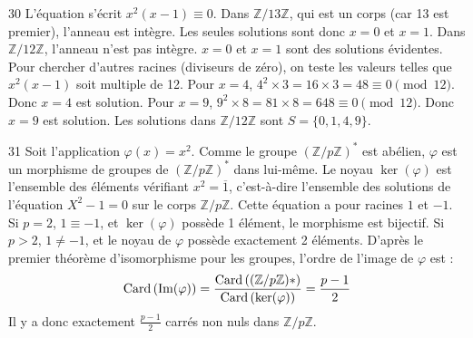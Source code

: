 \begin{correction}{30}
L'équation s'écrit $x^2(x-1) \equiv 0$.
Dans $\mathbb{Z}/13\mathbb{Z}$, qui est un corps (car 13 est premier), l'anneau est intègre. Les seules solutions sont donc $x=0$ et $x=1$.
Dans $\mathbb{Z}/12\mathbb{Z}$, l'anneau n'est pas intègre. $x=0$ et $x=1$ sont des solutions évidentes.
Pour chercher d'autres racines (diviseurs de zéro), on teste les valeurs telles que $x^2(x-1)$ soit multiple de 12.
Pour $x=4$, $4^2 \times 3 = 16 \times 3 = 48 \equiv 0 \pmod{12}$. Donc $x=4$ est solution.
Pour $x=9$, $9^2 \times 8 = 81 \times 8 = 648 \equiv 0 \pmod{12}$. Donc $x=9$ est solution.
Les solutions dans $\mathbb{Z}/12\mathbb{Z}$ sont $S = \{0, 1, 4, 9\}$.
\end{correction}

\begin{correction}{31}
Soit l'application $\varphi(x) = x^2$. Comme le groupe $(\mathbb{Z}/p\mathbb{Z})^*$ est abélien, $\varphi$ est un morphisme de groupes de $(\mathbb{Z}/p\mathbb{Z})^*$ dans lui-même. 
Le noyau $\ker(\varphi)$ est l'ensemble des éléments vérifiant $x^2 = \overline{1}$, c'est-à-dire l'ensemble des solutions de l'équation $X^2 - 1 = 0$ sur le corps $\mathbb{Z}/p\mathbb{Z}$. 
Cette équation a pour racines $1$ et $-1$. 
Si $p=2$, $1 \equiv -1$, et $\ker(\varphi)$ possède 1 élément, le morphisme est bijectif. 
Si $p>2$, $1 \neq -1$, et le noyau de $\varphi$ possède exactement 2 éléments. 
D'après le premier théorème d'isomorphisme pour les groupes, l'ordre de l'image de $\varphi$ est :
$$ \operatorname{Card} \,(\text{Im}(\varphi)) = \frac{\operatorname{Card} \,((\mathbb{Z}/p\mathbb{Z})*)}{\operatorname{Card} \,(\ker(\varphi))} = \frac{p-1}{2} $$ 
Il y a donc exactement $\frac{p-1}{2}$ carrés non nuls dans $\mathbb{Z}/p\mathbb{Z}$. 
\end{correction}

